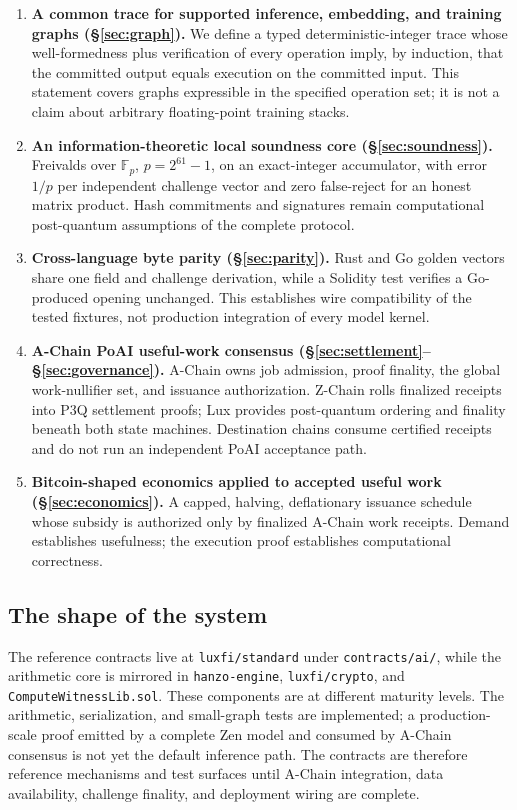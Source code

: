 \documentclass[11pt,a4paper]{article}
\begin{document}
\begin{enumerate}
  \item \textbf{A common trace for supported inference, embedding, and training graphs (\S\ref{sec:graph}).} We define a typed deterministic-integer trace whose well-formedness plus verification of every operation imply, by induction, that the committed output equals execution on the committed input. This statement covers graphs expressible in the specified operation set; it is not a claim about arbitrary floating-point training stacks.
  \item \textbf{An information-theoretic local soundness core (\S\ref{sec:soundness}).} Freivalds over $\mathbb{F}_p$, $p = 2^{61}-1$, on an exact-integer accumulator, with error $1/p$ per independent challenge vector and zero false-reject for an honest matrix product. Hash commitments and signatures remain computational post-quantum assumptions of the complete protocol.
  \item \textbf{Cross-language byte parity (\S\ref{sec:parity}).} Rust and Go golden vectors share one field and challenge derivation, while a Solidity test verifies a Go-produced opening unchanged. This establishes wire compatibility of the tested fixtures, not production integration of every model kernel.
  \item \textbf{A-Chain PoAI useful-work consensus (\S\ref{sec:settlement}--\S\ref{sec:governance}).} A-Chain owns job admission, proof finality, the global work-nullifier set, and issuance authorization. Z-Chain rolls finalized receipts into P3Q settlement proofs; Lux provides post-quantum ordering and finality beneath both state machines. Destination chains consume certified receipts and do not run an independent PoAI acceptance path.
  \item \textbf{Bitcoin-shaped economics applied to accepted useful work (\S\ref{sec:economics}).} A capped, halving, deflationary issuance schedule whose subsidy is authorized only by finalized A-Chain work receipts. Demand establishes usefulness; the execution proof establishes computational correctness.
\end{enumerate}

\subsection{The shape of the system}

The reference contracts live at \texttt{luxfi/standard} under \texttt{contracts/ai/}, while the arithmetic core is mirrored in \texttt{hanzo-engine}, \texttt{luxfi/crypto}, and \texttt{ComputeWitnessLib.sol}. These components are at different maturity levels. The arithmetic, serialization, and small-graph tests are implemented; a production-scale proof emitted by a complete Zen model and consumed by A-Chain consensus is not yet the default inference path. The contracts are therefore reference mechanisms and test surfaces until A-Chain integration, data availability, challenge finality, and deployment wiring are complete.
\end{document}
